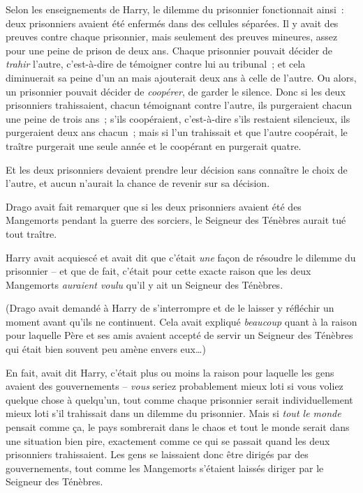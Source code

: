 Selon les enseignements de Harry, le dilemme du prisonnier fonctionnait ainsi~: deux prisonniers avaient été enfermés dans des cellules séparées.
Il y avait des preuves contre chaque prisonnier, mais seulement des preuves mineures, assez pour une peine de prison de deux ans.
Chaque prisonnier pouvait décider de \emph{trahir} l'autre, c'est-à-dire de témoigner contre lui au tribunal~; et cela diminuerait sa peine d'un an mais ajouterait deux ans à celle de l'autre.
Ou alors, un prisonnier pouvait décider de \emph{coopérer}, de garder le silence.
Donc si les deux prisonniers trahissaient, chacun témoignant contre l'autre, ils purgeraient chacun une peine de trois ans~; s'ils coopéraient, c'est-à-dire s'ils restaient silencieux, ils purgeraient deux ans chacun~; mais si l'un trahissait et que l'autre coopérait, le traître purgerait une seule année et le coopérant en purgerait quatre.

Et les deux prisonniers devaient prendre leur décision sans connaître le choix de l'autre, et aucun n'aurait la chance de revenir sur sa décision.

Drago avait fait remarquer que si les deux prisonniers avaient été des Mangemorts pendant la guerre des sorciers, le Seigneur des Ténèbres aurait tué tout traître.

Harry avait acquiescé et avait dit que c'était \emph{une} façon de résoudre le dilemme du prisonnier -- et que de fait, c'était pour cette exacte raison que les deux Mangemorts \emph{auraient voulu} qu'il y ait un Seigneur des Ténèbres.

(Drago avait demandé à Harry de s'interrompre et de le laisser y réfléchir un moment avant qu'ils ne continuent.
Cela avait expliqué \emph{beaucoup} quant à la raison pour laquelle Père et ses amis avaient accepté de servir un Seigneur des Ténèbres qui était bien souvent peu amène envers eux…)

En fait, avait dit Harry, c'était plus ou moins la raison pour laquelle les gens avaient des gouvernements -- \emph{vous} seriez probablement mieux loti si vous voliez quelque chose à quelqu'un, tout comme chaque prisonnier serait individuellement mieux loti s'il trahissait dans un dilemme du prisonnier.
Mais si \emph{tout le monde} pensait comme ça, le pays sombrerait dans le chaos et tout le monde serait dans une situation bien pire, exactement comme ce qui se passait quand les deux prisonniers trahissaient.
Les gens se laissaient donc être dirigés par des gouvernements, tout comme les Mangemorts s'étaient laissés diriger par le Seigneur des Ténèbres.


